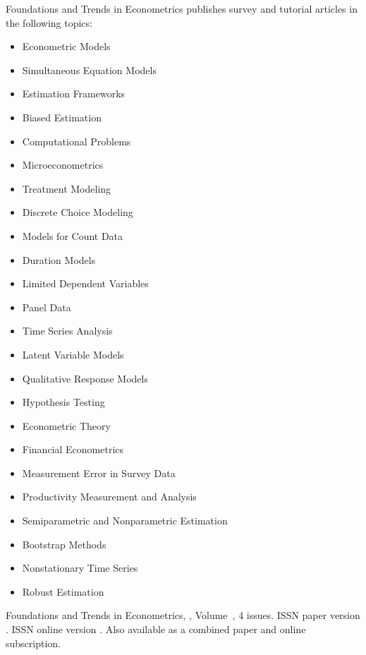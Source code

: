 


\journalaimsandscope
 {%
  Foundations and Trends\textsuperscript{\textregistered} in
Econometrics publishes
 survey and tutorial articles in the following topics: 
\begin{multicols}{2}\raggedcolumns
\begin{itemize}
\item{Econometric Models}
    \item{Simultaneous Equation Models}
    \item{Estimation Frameworks}
    \item{Biased Estimation}
    \item{Computational Problems}
    \item{Microeconometrics}
    \item{Treatment Modeling}
    \item{Discrete Choice Modeling}
    \item{Models for Count Data}
    \item{Duration Models}
   \item{Limited Dependent Variables}
    \item{Panel Data}
    \item{Time Series Analysis}
    \item{Latent Variable Models}
    \item{Qualitative Response Models}
    \item{Hypothesis Testing}
    \item{Econometric Theory}
    \item{Financial Econometrics}
    \item{Measurement Error in Survey Data}
    \item{Productivity Measurement and Analysis}
    \item{Semiparametric and Nonparametric Estimation}
    \item{Bootstrap Methods}
    \item{Nonstationary Time Series}
    \item{Robust Estimation}
\end{itemize}
 \end{multicols}
 }

\journallibraryinfo
 {%
  Foundations and Trends\textsuperscript{\textregistered} in
  Econometrics, ,
  Volume~, 4 issues.
  ISSN paper version .
  ISSN online version .
  Also available as a combined paper and online
  subscription.
 } 